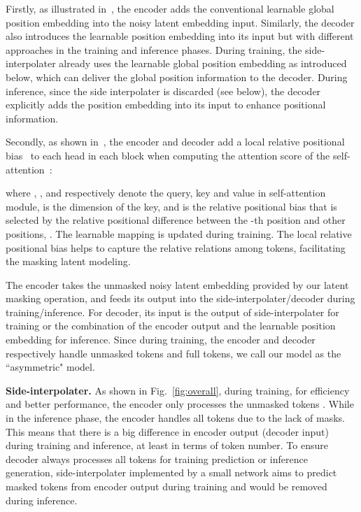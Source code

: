 \documentclass[final]{cvpr}
\newcommand{\myPara}[1]{\vspace{.08in} \noindent\textbf{#1}}
\begin{document}
Firstly,  as illustrated in~,  the encoder adds the conventional learnable global position embedding into the noisy latent embedding input. 
Similarly,  the decoder also introduces the learnable position embedding into its input but with different approaches in the training and inference phases. During training, the side-interpolater already uses  the learnable global position embedding as introduced below, which can deliver the global position information to the decoder. During inference, since the side interpolater is discarded (see below),  the decoder explicitly adds the position embedding into its input to enhance positional information.


Secondly,  as shown in~,   the encoder and decoder  
   add a local relative positional bias~\cite{liu2021swin} to each head in each block when computing
the attention score of the self-attention~\cite{vaswani2017attention}: 

where , , and   respectively denote the query, key and value in self-attention module,  is the  dimension of the key, 
and  is the relative positional bias
that is selected by the relative positional difference  between the -th position  and other positions, \ie . The learnable mapping 
 is updated during training. 
The  local relative positional bias helps to capture the relative relations
among tokens, facilitating the masking latent  modeling.

The encoder takes the unmasked noisy latent embedding provided by our latent masking operation, 
and feeds its output into the side-interpolater/decoder during training/inference.   
For decoder, its input is the output of side-interpolater for training or the combination of the encoder output and the learnable position embedding for inference. 
Since during training, the encoder and decoder respectively handle unmasked tokens and full tokens, 
we call our model as the  ``asymmetric" model.  

 

\myPara{Side-interpolater.} As shown in Fig.~\ref{fig:overall}, during training, for efficiency and better performance, 
the encoder only processes the  unmasked tokens .
While in the inference phase,  
the encoder handles all tokens  due to the lack of masks. 
This means that there is a big difference in encoder output (\ie decoder input) during training and inference, at least in terms of token number. 
To ensure decoder always processes all tokens for training prediction  or inference  generation, 
side-interpolater implemented by a small network aims to predict masked tokens from encoder output during training and would be removed during inference. 
\end{document}
